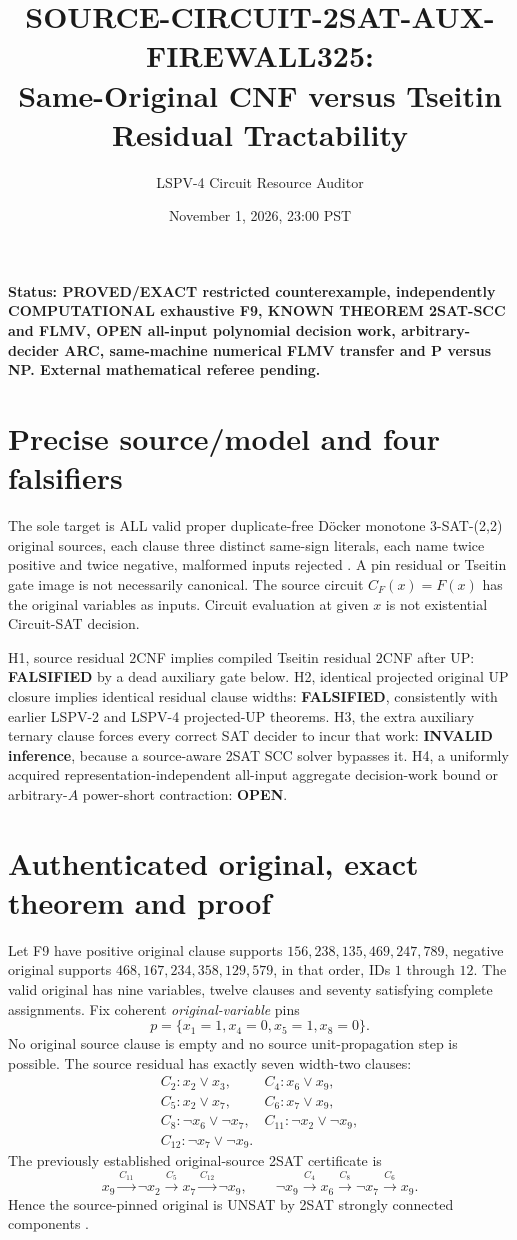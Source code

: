 \documentclass[11pt]{article}
\title{SOURCE-CIRCUIT-2SAT-AUX-FIREWALL325:\\Same-Original CNF versus Tseitin Residual Tractability}
\author{LSPV-4 Circuit Resource Auditor}
\date{November 1, 2026, 23:00 PST}
\begin{document}
\maketitle
\noindent\textbf{Status: PROVED/EXACT restricted counterexample, independently COMPUTATIONAL exhaustive F9, KNOWN THEOREM 2SAT-SCC and FLMV, OPEN all-input polynomial decision work, arbitrary-decider ARC, same-machine numerical FLMV transfer and P versus NP. External mathematical referee pending.}

\section{Precise source/model and four falsifiers}
The sole target is ALL valid proper duplicate-free D\"ocker monotone 3-SAT-(2,2) original sources, each clause three distinct same-sign literals, each name twice positive and twice negative, malformed inputs rejected \cite{doecker2019}. A pin residual or Tseitin gate image is not necessarily canonical. The source circuit $C_F(x)=F(x)$ has the original variables as inputs. Circuit evaluation at given $x$ is not existential Circuit-SAT decision.

\noindent H1, source residual $2$CNF implies compiled Tseitin residual $2$CNF after UP: \textbf{FALSIFIED} by a dead auxiliary gate below. H2, identical projected original UP closure implies identical residual clause widths: \textbf{FALSIFIED}, consistently with earlier LSPV-2 and LSPV-4 projected-UP theorems. H3, the extra auxiliary ternary clause forces every correct SAT decider to incur that work: \textbf{INVALID inference}, because a source-aware 2SAT SCC solver bypasses it. H4, a uniformly acquired representation-independent all-input aggregate decision-work bound or arbitrary-$A$ power-short contraction: \textbf{OPEN}.

\section{Authenticated original, exact theorem and proof}
Let F9 have positive original clause supports $156,238,135,469,247,789$, negative original supports $468,167,234,358,129,579$, in that order, IDs $1$ through $12$. The valid original has nine variables, twelve clauses and seventy satisfying complete assignments. Fix coherent \emph{original-variable} pins
\[
p=\{x_1=1,x_4=0,x_5=1,x_8=0\}.
\]
No original source clause is empty and no source unit-propagation step is possible. The source residual has exactly seven width-two clauses:
\[
\begin{array}{ll}
C_2:x_2\vee x_3,&C_4:x_6\vee x_9,\\
C_5:x_2\vee x_7,&C_6:x_7\vee x_9,\\
C_8:\neg x_6\vee\neg x_7,&C_{11}:\neg x_2\vee\neg x_9,\\
C_{12}:\neg x_7\vee\neg x_9.&
\end{array}
\]
The previously established original-source 2SAT certificate is
\[
x_9\xrightarrow{C_{11}}\neg x_2\xrightarrow{C_5}x_7
\xrightarrow{C_{12}}\neg x_9,\qquad
\neg x_9\xrightarrow{C_4}x_6\xrightarrow{C_8}\neg x_7
\xrightarrow{C_6}x_9.
\]
Hence the source-pinned original is UNSAT by 2SAT strongly connected components \cite{apt1979}.
\end{document}
